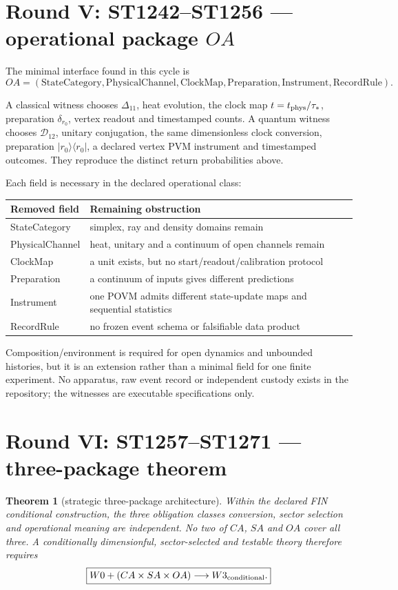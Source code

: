 \documentclass[11pt,a4paper]{article}
\newtheorem{theorem}{Theorem}\newtheorem{proposition}[theorem]{Proposition}\newtheorem{corollary}[theorem]{Corollary}
\begin{document}
\section{Round V: ST1242--ST1256 --- operational package $OA$}

The minimal interface found in this cycle is
\[
 OA=(\text{StateCategory},\text{PhysicalChannel},\text{ClockMap},
     \text{Preparation},\text{Instrument},\text{RecordRule}).
\]

A classical witness chooses $\Delta_{11}$, heat evolution, the clock map
$t=t_{\rm phys}/\tau_*$, preparation $\delta_{r_0}$, vertex readout and
timestamped counts.  A quantum witness chooses $\mathcal D_{12}$, unitary
conjugation, the same dimensionless clock conversion, preparation
$|r_0\rangle\langle r_0|$, a declared vertex PVM instrument and timestamped
outcomes.  They reproduce the distinct return probabilities above.

Each field is necessary in the declared operational class:
\begin{longtable}{@{}p{}p{}@{}}
\toprule
Removed field & Remaining obstruction \\
\midrule\endhead
StateCategory & simplex, ray and density domains remain \\
PhysicalChannel & heat, unitary and a continuum of open channels remain \\
ClockMap & a unit exists, but no start/readout/calibration protocol \\
Preparation & a continuum of inputs gives different predictions \\
Instrument & one POVM admits different state-update maps and sequential statistics \\
RecordRule & no frozen event schema or falsifiable data product \\
\bottomrule
\end{longtable}

Composition/environment is required for open dynamics and unbounded histories,
but it is an extension rather than a minimal field for one finite experiment.
No apparatus, raw event record or independent custody exists in the repository;
the witnesses are executable specifications only.

\section{Round VI: ST1257--ST1271 --- three-package theorem}

\begin{theorem}[strategic three-package architecture]
Within the declared FIN conditional construction, the three obligation classes
conversion, sector selection and operational meaning are independent.  No two
of $CA$, $SA$ and $OA$ cover all three.  A conditionally dimensionful,
sector-selected and testable theory therefore requires
\[
 \boxed{W0+(CA\times SA\times OA)\longrightarrow W3_{\rm conditional}.}
\]
\end{theorem}
\end{document}
